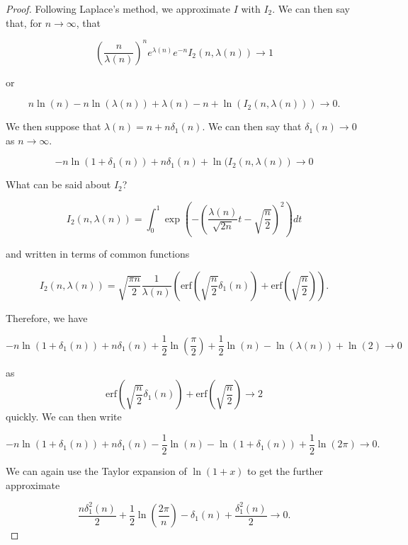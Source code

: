 \documentclass[12pt]{article}
\theoremstyle{plain}
\theoremstyle{definition}
\theoremstyle{remark}
\theoremstyle{definition}
\begin{document}
\begin{proof}
Following Laplace's method, we approximate $I$ with $I_2$. We can then say that, for $n \to \infty$, that

$$\left(\frac{n}{\lambda(n)}\right)^ne^{\lambda(n)}e^{-n}I_2(n,\lambda(n)) \to 1$$

or 

\begin{equation}
    n\ln(n) -n\ln(\lambda(n)) + \lambda(n)-n+\ln(I_2(n,\lambda(n))) \to 0.
\end{equation}

We then suppose that $\lambda(n) = n + n\delta_1(n)$. We can then say that $\delta_1(n) \to 0$ as $n \to \infty$.

\begin{equation}
    -n\ln(1+\delta_1(n)) + n\delta_1(n) + \ln(I_2(n,\lambda(n)) \to 0
\end{equation}

What can be said about $I_2$?

\begin{equation}
    I_2(n,\lambda(n)) = \int_0^1\exp{\left(-\left(\frac{\lambda(n)}{\sqrt{2n}}t-\sqrt{\frac{n}{2}}\right)^2\right)}dt
\end{equation}

and written in terms of common functions

\begin{equation}
    I_2(n,\lambda(n)) = \sqrt{\frac{\pi n}{2}}\frac{1}{\lambda(n)}\left(\text{erf}\left(\sqrt{\frac{n}{2}}\delta_1(n)\right) + \text{erf}\left({\sqrt{\frac{n}{2}}}\right)\right).
\end{equation}

Therefore, we have

\begin{equation}
    -n\ln(1+\delta_1(n)) + n\delta_1(n) +\frac{1}{2}\ln\left(\frac{\pi}{2}\right) + \frac{1}{2}\ln(n) - \ln(\lambda(n)) + \ln(2) \to 0
\end{equation}

as 
$$\text{erf}\left(\sqrt{\frac{n}{2}}\delta_1(n)\right) + \text{erf}\left({\sqrt{\frac{n}{2}}}\right) \to 2$$
quickly. We can then write

\begin{equation}
    -n\ln(1+\delta_1(n)) + n\delta_1(n) - \frac{1}{2}\ln(n) -\ln(1+\delta_1(n)) + \frac{1}{2}\ln(2\pi) \to 0.
\end{equation}

We can again use the Taylor expansion of $\ln(1+x)$ to get the further approximate

\begin{equation}\label{eq: many taylor series later}
    \frac{n\delta_1^2(n)}{2} + \frac{1}{2}\ln\left(\frac{2\pi}{n}\right)-\delta_1(n)+\frac{\delta_1^2(n)}{2} \to 0.
\end{equation}


\end{proof}
\end{document}
